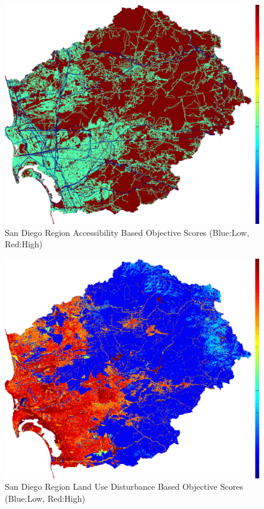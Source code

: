         \begin{figure}[!h]
            \begin{center}
            \includegraphics[width=5.5in]{figures/SanDiego_AccessibilityScore.png}   
            \caption{San Diego Region Accessibility Based Objective Scores (Blue:Low, Red:High)}
            \label{fig:SDaccessibilty}
            \end{center}
        \end{figure}

        \begin{figure}[!h]
            \begin{center}
            \includegraphics[width=5.5in]{figures/SanDiego_DisturbanceScore.png}   
            \caption{San Diego Region Land Use Disturbance Based Objective Scores (Blue:Low, Red:High)}
            \label{fig:SDdisturbance}
            \end{center}
        \end{figure}
        

